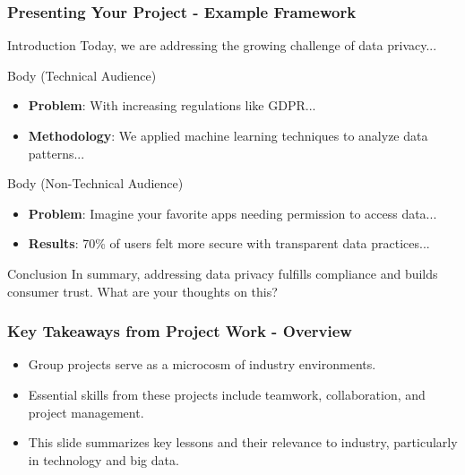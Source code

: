 \documentclass[aspectratio=169]{beamer}
\begin{document}
\begin{frame}[fragile]
    \frametitle{Presenting Your Project - Example Framework}
    \begin{block}{Introduction}
        Today, we are addressing the growing challenge of data privacy...
    \end{block}

    \begin{block}{Body (Technical Audience)}
        \begin{itemize}
            \item \textbf{Problem}: With increasing regulations like GDPR...
            \item \textbf{Methodology}: We applied machine learning techniques to analyze data patterns...
        \end{itemize}
    \end{block}

    \begin{block}{Body (Non-Technical Audience)}
        \begin{itemize}
            \item \textbf{Problem}: Imagine your favorite apps needing permission to access data...
            \item \textbf{Results}: 70\% of users felt more secure with transparent data practices...
        \end{itemize}
    \end{block}

    \begin{block}{Conclusion}
        In summary, addressing data privacy fulfills compliance and builds consumer trust. What are your thoughts on this?
    \end{block}
\end{frame}

\begin{frame}[fragile]
    \frametitle{Key Takeaways from Project Work - Overview}
    \begin{itemize}
        \item Group projects serve as a microcosm of industry environments.
        \item Essential skills from these projects include teamwork, collaboration, and project management.
        \item This slide summarizes key lessons and their relevance to industry, particularly in technology and big data.
    \end{itemize}
\end{frame}
\end{document}
